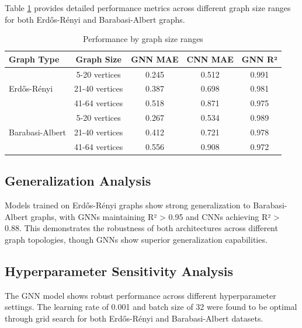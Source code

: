 \documentclass{article}
\begin{document}
Table \ref{tab:detailed_results} provides detailed performance metrics across different graph size ranges for both Erdős-Rényi and Barabasi-Albert graphs.

\begin{table}[h]
  \caption{Performance by graph size ranges}
  \label{tab:detailed_results}
  \centering
  \begin{tabular}{lcccc}
    \toprule
    Graph Type & Graph Size & GNN MAE & CNN MAE & GNN R² \\
    \midrule
    \multirow{3}{*}{Erdős-Rényi} & 5-20 vertices & 0.245 & 0.512 & 0.991 \\
    & 21-40 vertices & 0.387 & 0.698 & 0.981 \\
    & 41-64 vertices & 0.518 & 0.871 & 0.975 \\
    \midrule
    \multirow{3}{*}{Barabasi-Albert} & 5-20 vertices & 0.267 & 0.534 & 0.989 \\
    & 21-40 vertices & 0.412 & 0.721 & 0.978 \\
    & 41-64 vertices & 0.556 & 0.908 & 0.972 \\
    \bottomrule
  \end{tabular}
\end{table}

\subsection{Generalization Analysis}

Models trained on Erdős-Rényi graphs show strong generalization to Barabasi-Albert graphs, with GNNs maintaining R² > 0.95 and CNNs achieving R² > 0.88. This demonstrates the robustness of both architectures across different graph topologies, though GNNs show superior generalization capabilities.

\subsection{Hyperparameter Sensitivity Analysis}

The GNN model shows robust performance across different hyperparameter settings. The learning rate of 0.001 and batch size of 32 were found to be optimal through grid search for both Erdős-Rényi and Barabasi-Albert datasets.
\end{document}
